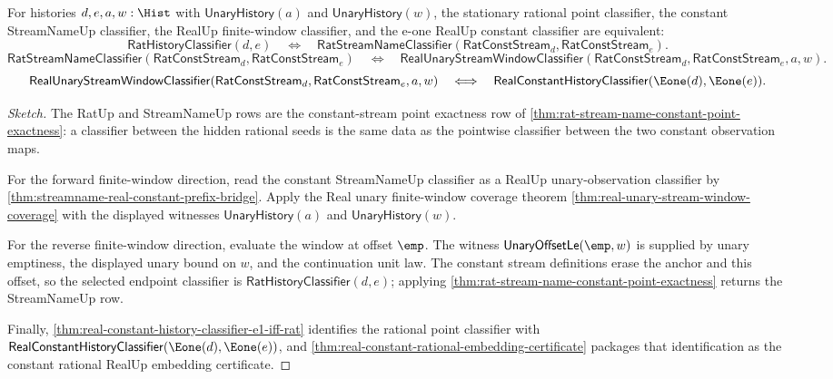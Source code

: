 \begin{theorem}
\label{thm:real-completeness-stationary-rational-finite-window-bridge}
For histories $d,e,a,w:\Hist$ with $\mathsf{UnaryHistory}(a)$ and
$\mathsf{UnaryHistory}(w)$, the stationary rational point classifier, the
constant StreamNameUp classifier, the RealUp finite-window classifier, and the
e-one RealUp constant classifier are equivalent:
$$
\mathsf{RatHistoryClassifier}(d,e)
\quad\Longleftrightarrow\quad
\mathsf{RatStreamNameClassifier}(\mathsf{RatConstStream}_d,\mathsf{RatConstStream}_e).
$$
$$
\mathsf{RatStreamNameClassifier}(\mathsf{RatConstStream}_d,\mathsf{RatConstStream}_e)
\quad\Longleftrightarrow\quad
\mathsf{RealUnaryStreamWindowClassifier}(\mathsf{RatConstStream}_d,\mathsf{RatConstStream}_e,a,w).
$$
$$
\mathsf{RealUnaryStreamWindowClassifier}(\mathsf{RatConstStream}_d,\mathsf{RatConstStream}_e,a,w)
\quad\Longleftrightarrow\quad
\mathsf{RealConstantHistoryClassifier}(\Eone(d),\Eone(e)).
$$
\end{theorem}

\begin{proof}[Sketch]
The RatUp and StreamNameUp rows are the constant-stream point exactness row of
\autoref{thm:rat-stream-name-constant-point-exactness}: a classifier between
the hidden rational seeds is the same data as the pointwise classifier between
the two constant observation maps.

For the forward finite-window direction, read the constant StreamNameUp
classifier as a RealUp unary-observation classifier by
\autoref{thm:streamname-real-constant-prefix-bridge}. Apply the Real unary
finite-window coverage theorem \autoref{thm:real-unary-stream-window-coverage}
with the displayed witnesses $\mathsf{UnaryHistory}(a)$ and
$\mathsf{UnaryHistory}(w)$.

For the reverse finite-window direction, evaluate the window at offset $\emp$.
The witness $\mathsf{UnaryOffsetLe}(\emp,w)$ is supplied by unary emptiness, the
displayed unary bound on $w$, and the continuation unit law. The constant
stream definitions erase the anchor and this offset, so the selected endpoint
classifier is $\mathsf{RatHistoryClassifier}(d,e)$; applying
\autoref{thm:rat-stream-name-constant-point-exactness} returns the
StreamNameUp row.

Finally, \autoref{thm:real-constant-history-classifier-e1-iff-rat} identifies
the rational point classifier with
$\mathsf{RealConstantHistoryClassifier}(\Eone(d),\Eone(e))$, and
\autoref{thm:real-constant-rational-embedding-certificate} packages that
identification as the constant rational RealUp embedding certificate.
\end{proof}

